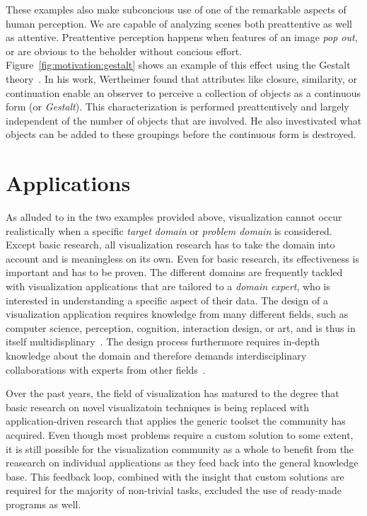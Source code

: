 These examples also make subconcious use of one of the remarkable aspects of human perception.  We are capable of analyzing scenes both preattentive as well as attentive.  Preattentive perception happens when features of an image \emph{pop out}, or are obvious to the beholder without concious effort.  Figure~\ref{fig:motivation:gestalt} shows an example of this effect using the Gestalt theory~\cite{wertheimer1922untersuchungen}.  In his work, Wertheimer found that attributes like closure, similarity, or continuation enable an observer to perceive a collection of objects as a continuous form (or \emph{Gestalt}).  This characterization is performed preattentively and largely independent of the number of objects that are involved. He also investivated what objects can be added to these groupings before the continuous form is destroyed. 

\section{Applications}
As alluded to in the two examples provided above, visualization cannot occur realistically when a specific \emph{target domain} or \emph{problem domain} is considered.  Except basic research, all visualization research has to take the domain into account and is meaningless on its own.  Even for basic research, its effectiveness is important and has to be proven.  The different domains are frequently tackled with visualization applications that are tailored to a \emph{domain expert}, who is interested in understanding a specific aspect of their data.  The design of a visualization application requires knowledge from many different fields, such as computer science, perception, cognition, interaction design, or art, and is thus in itself multidisplinary~\cite{mccormick1987visualization}.  The design process furthermore requires in-depth knowledge about the domain and therefore demands interdisciplinary collaborations with experts from other fields~\cite{kirby2013visualization}.

Over the past years, the field of visualization has matured to the degree that basic research on novel visualizatoin techniques is being replaced with application-driven research that applies the generic toolset the community has acquired.  Even though most problems require a custom solution to some extent, it is still possible for the visualization community as a whole to benefit from the reasearch on individual applications as they feed back into the general knowledge base.  This feedback loop, combined with the insight that custom solutions are required for the majority of non-trivial tasks, excluded the use of ready-made programs as well.


